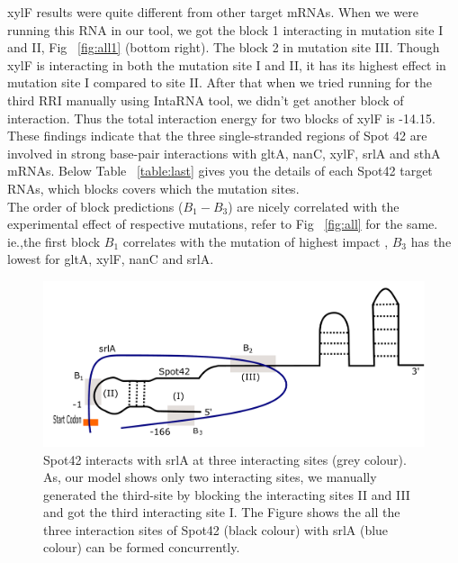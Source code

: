 \documentclass[twoside,a4paper]{report}
\numberwithin{equation}{section}
\begin{document}
 xylF results were quite different from other target mRNAs. When we were running this RNA in our tool, we got the block 1 interacting in mutation site I and II, Fig ~\ref{fig:all1} (bottom right). The block 2 in mutation site III. Though xylF is interacting in both the mutation site I and II, it has its highest effect in mutation site I compared to site II. After that when we tried running for the third RRI manually using IntaRNA tool, we didn't get another block of interaction. Thus the total interaction energy for two blocks of xylF is -14.15. These findings indicate that the three single-stranded regions of Spot 42 are involved in strong base-pair interactions with gltA, nanC, xylF, srlA and sthA mRNAs. Below Table ~\ref{table:last} gives you the details of each Spot42 target RNAs, which blocks covers which the mutation sites.\\
 
 The order of block predictions ($B_1-B_3$) are nicely correlated with the experimental effect of respective mutations, refer to Fig ~\ref{fig:all} for the same. ie.,the first block $B_1$ correlates with the mutation of highest impact , $B_3$ has the lowest for gltA, xylF, nanC and srlA.\\
 
 	

	\begin{figure}[h!tb]
	\includegraphics[width=0.85\linewidth]{srlathirdsite.pdf}
	\centering
	\caption{ Spot42 interacts with srlA at three interacting sites (grey colour). As, our model shows only two interacting sites, we manually generated the third-site by blocking the interacting sites II and III and got the third interacting site I. The Figure shows the all the three interaction sites of Spot42 (black colour) with srlA (blue colour) can be formed concurrently.  } 
	\label{fig:slrathirdsite}
\end{figure}
\end{document}
